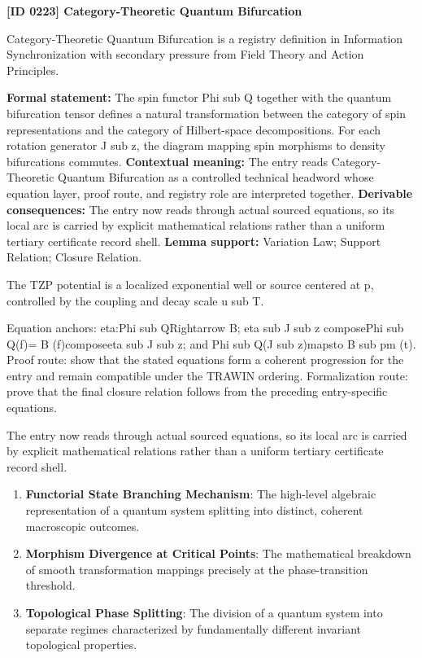 \clearpage
\noindent\textbf{[ID 0223] Category-Theoretic Quantum Bifurcation}\par
\vspace{0.35em}
\begingroup\small
{}
Category-Theoretic Quantum Bifurcation is a registry definition in Information Synchronization with secondary pressure from Field Theory and Action Principles.

\begingroup\footnotesize\setlength{\emergencystretch}{3em}\sloppy
\textbf{Formal statement:} The spin functor Phi sub Q together with the quantum bifurcation tensor defines a natural transformation between the category of spin representations and the category of Hilbert-space decompositions. For each rotation generator J sub z, the diagram mapping spin morphisms to density bifurcations commutes. \textbf{Contextual meaning:} The entry reads Category-Theoretic Quantum Bifurcation as a controlled technical headword whose equation layer, proof route, and registry role are interpreted together. \textbf{Derivable consequences:} The entry now reads through actual sourced equations, so its local arc is carried by explicit mathematical relations rather than a uniform tertiary certificate record shell. \textbf{Lemma support:} Variation Law; Support Relation; Closure Relation.\par
\endgroup

The TZP potential is a localized exponential well or source centered at p, controlled by the coupling and decay scale u sub T.

Equation anchors: eta:Phi sub QRightarrow B; eta sub J sub z composePhi sub Q(f)= B (f)composeeta sub J sub z; and Phi sub Q(J sub z)mapsto B sub pm (t). Proof route: show that the stated equations form a coherent progression for the entry and remain compatible under the TRAWIN ordering. Formalization route: prove that the final closure relation follows from the preceding entry-specific equations.

The entry now reads through actual sourced equations, so its local arc is carried by explicit mathematical relations rather than a uniform tertiary certificate record shell.
\endgroup

\begin{enumerate}[leftmargin=1.6em,itemsep=6pt,topsep=4pt]
\item \textbf{Functorial State Branching Mechanism}: The high-level algebraic representation of a quantum system splitting into distinct, coherent macroscopic outcomes.
\item \textbf{Morphism Divergence at Critical Points}: The mathematical breakdown of smooth transformation mappings precisely at the phase-transition threshold.
\item \textbf{Topological Phase Splitting}: The division of a quantum system into separate regimes characterized by fundamentally different invariant topological properties.
\end{enumerate}

